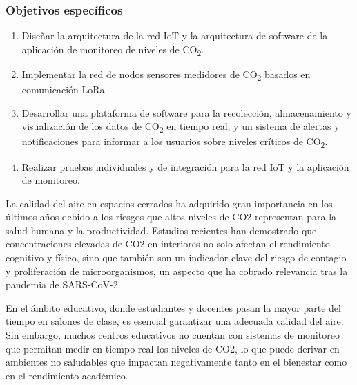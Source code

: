 \subsubsection*{Objetivos específicos}
\begin{enumerate}

\item Diseñar la arquitectura de la red IoT y la arquitectura de software de la aplicación de monitoreo de niveles de CO\textsubscript{2}.
\item Implementar la red de nodos sensores medidores de CO\textsubscript{2} basados en comunicación LoRa
\item Desarrollar una plataforma de software para la recolección, almacenamiento y visualización de los datos de CO\textsubscript{2} en tiempo real, y un sistema de alertas y notificaciones para informar a los usuarios sobre niveles críticos de CO\textsubscript{2}.
\item Realizar pruebas individuales y de integración para la red IoT y la aplicación de monitoreo.

\end{enumerate}



La calidad del aire en espacios cerrados ha adquirido gran importancia en los últimos años debido a los riesgos que altos niveles de CO2 representan para la salud humana y la productividad. Estudios recientes han demostrado que concentraciones elevadas de CO2 en interiores no solo afectan el rendimiento cognitivo y físico, sino que también son un indicador clave del riesgo de contagio y proliferación de microorganismos, un aspecto que ha cobrado relevancia tras la pandemia de SARS-CoV-2.

En el ámbito educativo, donde estudiantes y docentes pasan la mayor parte del tiempo en salones de clase, es esencial garantizar una adecuada calidad del aire. Sin embargo, muchos centros educativos no cuentan con sistemas de monitoreo que permitan medir en tiempo real los niveles de CO2, lo que puede derivar en ambientes no saludables que impactan negativamente tanto en el bienestar como en el rendimiento académico.


